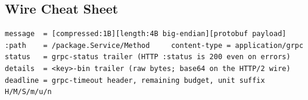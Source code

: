 \subsection*{Wire Cheat Sheet}
\begin{verbatim}
message  = [compressed:1B][length:4B big-endian][protobuf payload]
:path    = /package.Service/Method     content-type = application/grpc
status   = grpc-status trailer (HTTP :status is 200 even on errors)
details  = <key>-bin trailer (raw bytes; base64 on the HTTP/2 wire)
deadline = grpc-timeout header, remaining budget, unit suffix H/M/S/m/u/n
\end{verbatim}


